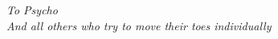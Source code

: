 \thispagestyle{plain}

\begin{flushright}
 \Large\em\null\vskip5cm To Psycho \\
 \large And all others who try to move their toes individually
\end{flushright}
